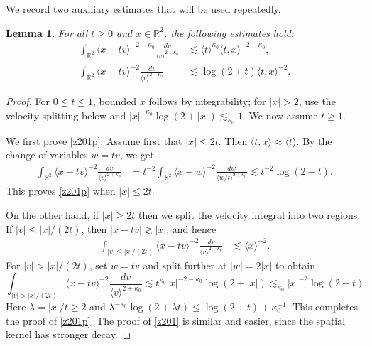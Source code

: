 \documentclass[reqno,11pt]{amsart}
\numberwithin{equation}{section}
\newtheorem{lemma}[theorem]{Lemma}
\begin{document}
	We record two auxiliary estimates that will be used repeatedly. 
		
	\begin{lemma}\label{Le1}
		For all $t\ge0$ and $x\in\mathbb R^2$, the following estimates hold:
		\begin{align}
			\int_{\mathbb R^2}
			\langle x-tv\rangle^{-2-\kappa_0}
			\frac{dv}{\langle v\rangle^{2+\kappa_0}}
			&\lesssim
			\langle t\rangle^{\kappa_0}
			\langle t,x\rangle^{-2-\kappa_0},
			\label{z201}
			\\
			\int_{\mathbb R^2}
			\langle x-tv\rangle^{-2}
			\frac{dv}{\langle v\rangle^{2+\kappa_0}}
			&\lesssim
			\log(2+t)
			\langle t,x\rangle^{-2}.
			\label{z201p}
		\end{align}
	\end{lemma}
\begin{proof}
For $0\leq t\leq1$, bounded $x$ follows by integrability; for $|x|>2$,
use the velocity splitting below and
$|x|^{-\kappa_0}\log(2+|x|)\lesssim_{\kappa_0}1$.
We now assume $t\geq1$.
		
		We first prove \eqref{z201p}. Assume first that $|x|\le2t$. Then
		$\langle t,x\rangle\approx\langle t\rangle$. By the change of variables
		$w=tv$, we get
		\begin{align*}
			\int_{\mathbb R^2}
			\langle x-tv\rangle^{-2}
			\frac{dv}{\langle v\rangle^{2+\kappa_0}}
			&=
			t^{-2}
			\int_{\mathbb R^2}
			\langle x-w\rangle^{-2}
			\frac{dw}{\langle w/t\rangle^{2+\kappa_0}}\lesssim
			t^{-2}\log(2+t).
		\end{align*}
		This proves \eqref{z201p} when $|x|\le2t$.
		
		On the other hand, if $|x|\geq 2t$ then we split the velocity integral into two
		regions. If $|v|\le |x|/(2t)$, then $|x-tv|\gtrsim |x|$, and hence
		\begin{align*}
			\int_{|v|\le |x|/(2t)}
			\langle x-tv\rangle^{-2}
			\frac{dv}{\langle v\rangle^{2+\kappa_0}}
			&\lesssim
			\langle x\rangle^{-2}.
		\end{align*}
For $|v|>|x|/(2t)$, set $w=tv$ and split further at $|w|=2|x|$ to obtain
\[
\int_{|v|>|x|/(2t)}\langle x-tv\rangle^{-2}
\frac{dv}{\langle v\rangle^{2+\kappa_0}}
\lesssim t^{\kappa_0}|x|^{-2-\kappa_0}\log(2+|x|)
\lesssim_{\kappa_0}|x|^{-2}\log(2+t).
\]
Here $\lambda=|x|/t\geq2$ and
$\lambda^{-\kappa_0}\log(2+\lambda t)\leq\log(2+t)+\kappa_0^{-1}$.
This completes the proof of \eqref{z201p}.
	The proof of \eqref{z201} is similar and easier, since the spatial kernel
		has stronger decay.
		\end{proof}
	
\end{document}
